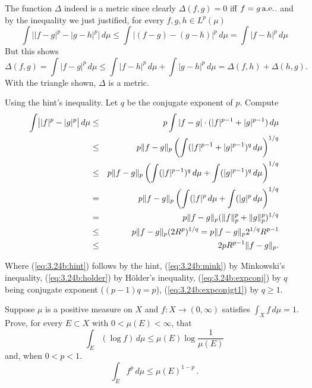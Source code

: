\begin{enumerate}
\begin{itemize}
 The function \(\Delta\) indeed is a metric since
 clearly \(\Delta(f,g) = 0\) iff \(f = g\,\textrm{a.e.}\).
 and by the inequality we just justified,
 for every \(f,g,h \in L^p(\mu)\)
 \begin{equation*}
   \int \bigl| |f-g|^p - |g-h|^p \bigr|\,d\mu
    \leq \int |(f-g) - (g-h)|^p \,d\mu
    = \int |f - h|^p \,d\mu
 \end{equation*}
 But this shows
 \begin{equation*}
   \Delta(f,g) = \int |f-g|^p\,d\mu
    \leq \int |f - h|^p \,d\mu + \int |g - h|^p \,d\mu =
   \Delta(f,h) +  \Delta(h,g).
 \end{equation*}
 With the triangle shown, \(\Delta\) is a metric.

 Using the hint's inequality. Let $q$ be the conjugate exponent of $p$.
 Compute
 \begin{eqnarray}
   \int \bigl| |f|^p - |g|^p \bigr|\,d\mu
  &\leq& \label{eq:3.24b:hint}
   p \int |f-g|\cdot ( |f|^{p-1} + |g|^{p-1})\,d\mu \\
  &\leq& \label{eq:3.24b:mink}
   p \|f-g\|_p \left(\int (|f|^{p-1} + |g|^{p-1})^q\,d\mu\right)^{1/q} \\
  &\leq& \label{eq:3.24b:holder}
   p \|f-g\|_p \left(\int (|f|^{p-1})^q\,d\mu +
                     \int (|g|^{p-1})^q\,d\mu \right)^{1/q} \\
  &=& \label{eq:3.24b:expconj}
   p \|f-g\|_p \left(\int (|f|^p\,d\mu + \int (|g|^p\,d\mu \right)^{1/q} \\
  &=& \notag
   p \|f-g\|_p (\|f\|_p^p + \|g\|_p^p)^{1/q} \\
  &\leq& \notag
   p \|f-g\|_p (2R^p)^{1/q} =  p \|f-g\|_p 2^{1/q}R^{p-1} \\
  &\leq& \label{eq:3.24b:expconjgt1}
   2pR^{p-1}\|f-g\|_p. \notag
 \end{eqnarray}

Where
  (\ref{eq:3.24b:hint}) follows by the hint,
  (\ref{eq:3.24b:mink}) by Minkowski's inequality,
  (\ref{eq:3.24b:holder}) by H\"older's inequality,
  (\ref{eq:3.24b:expconj}) by $q$ being conjugate exponent (\((p-1)q = p\)),
  (\ref{eq:3.24b:expconjgt1}) by \(q\geq 1\).
\end{itemize}


\begin{excopy}

Suppose \(\mu\) is a positive measure on $X$ and \(f: X\to(0,\infty)\) satisfies
\(\int_X f\,d\mu=1\).
Prove, for every \(E\subset X\) with \(0 < \mu(E) < \infty\), that
\begin{equation*}
\int_E (\log f)\,d\mu \leq \mu(E) \log \frac{1}{\mu(E)}
\end{equation*}
and, when \(0<p<1\).
\begin{equation*}
\int_E f^p\,d\mu \leq \mu(E)^{1-p}\,.
\end{equation*}
\end{excopy}


\end{enumerate}
